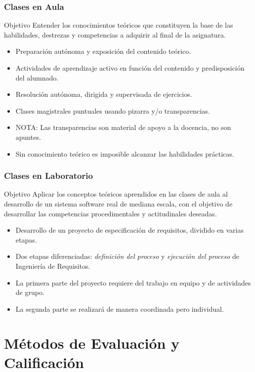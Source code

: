 \documentclass[handout,a4paper,slidestop,xcolor=pst,dvips,blue]{beamer}
\begin{document}
\begin{frame}
	\frametitle{Clases en Aula}
	\begin{block}{Objetivo}
        Entender los conocimientos teóricos que constituyen la base de las habilidades, destrezas y competencias a adquirir al final de la asignatura.
	\end{block}
	\begin{itemize}
        \item<2-> Preparación autónoma y exposición del contenido teórico.
        \item<3-> Actividades de aprendizaje activo en función del contenido y predisposición del alumnado.
		\item<4-> Resolución autónoma, dirigida y supervisada de ejercicios.
		\item<5-> Clases magistrales puntuales usando pizarra y/o transparencias.
		\item<6-> NOTA: \alert{Las transparencias} son material de apoyo a la docencia, \alert{no son apuntes}.
		\item<7-> \alert{Sin conocimiento teórico es imposible alcanzar las habilidades prácticas}.
	\end{itemize}
\end{frame}

\begin{frame}[c]
	\frametitle{Clases en Laboratorio}
	\begin{block}{Objetivo}
		Aplicar los conceptos teóricos aprendidos en las clases de aula al desarrollo de un sistema software real de mediana escala, con el objetivo
        de desarrollar las competencias procedimentales y actitudinales deseadas.
	\end{block}
	\begin{itemize}
        \item<2-> Desarrollo de un proyecto de especificación de requisitos, dividido en varias etapas.
		\item<3-> Dos etapas diferenciadas: \emph{definición del proceso} y \emph{ejecución del proceso} de Ingeniería de Requisitos.
        \item<4-> La primera parte del proyecto requiere del trabajo en equipo y de actividades de grupo.
        \item<5-> La segunda parte se realizará de manera coordinada pero individual.
	\end{itemize}
\end{frame}

\section{Métodos de Evaluación y Calificación}
\end{document}
